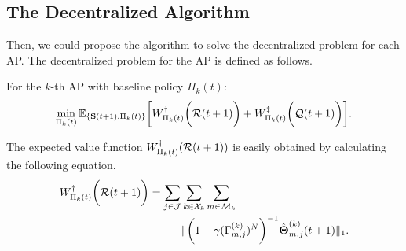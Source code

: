\subsection{The Decentralized Algorithm}
Then, we could propose the algorithm to solve the decentralized problem for each AP.
The decentralized problem for the AP is defined as follows.
\begin{problem}
    For the $k$-th AP with baseline policy $\Pi_{k}(t)$:
    \begin{align}
        \min_{\Pi_{k}(t)} \mathbb{E}_{\{ \mathbf{S}(t+1), \Pi_{k}(t) \}} \bigg[
            W^{\dagger}_{\Pi_{k}(t)}\bigg(\mathcal{R}(t+1)\bigg) + W^{\ddagger}_{\Pi_{k}(t)}\bigg(\mathcal{Q}(t+1)\bigg)
        \bigg].
        \label{eqn:partial}
    \end{align}
\end{problem}

The expected value function $W^{\dagger}_{\Pi_{k}(t)}(\mathcal{R}(t+1))$ is easily obtained by calculating the following equation.
\begin{align}
    W^{\dagger}_{\Pi_{k}(t)}\bigg(\mathcal{R}(t+1)\bigg) = \sum_{j\in\mathcal{J}}&\sum_{k\in\mathcal{X}_{k}}\sum_{m\in\mathcal{M}_{k}}
    \nonumber\\
    &\lVert
        \bigg( 1 - \gamma ({\Gamma}^{(k)}_{m,j})^{N} \bigg)^{-1} \hat{\boldsymbol{\Theta}}^{(k)}_{m,j}(t+1)
    \|_1.
    \label{w_ap}
\end{align}


